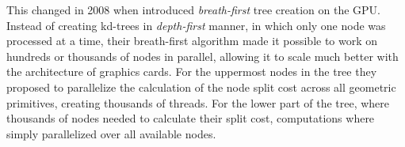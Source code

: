 This changed in 2008 when \zhou{} introduced \textit{breath-first} tree creation
on the GPU. Instead of creating kd-trees in \textit{depth-first} manner, in
which only one node was processed at a time, their breath-first algorithm made
it possible to work on hundreds or thousands of nodes in parallel, allowing it
to scale much better with the architecture of graphics cards. For the uppermost
nodes in the tree they proposed to parallelize the calculation of the node split
cost across all geometric primitives, creating thousands of threads. For the
lower part of the tree, where thousands of nodes needed to calculate their split
cost, computations where simply parallelized over all available nodes.



